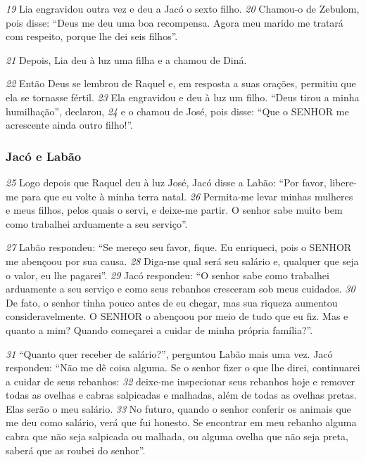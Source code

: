 \bigskip   
\textit{\tiny 19}
Lia
engravidou outra vez e deu a Jacó o sexto filho. 
\textit{\tiny 20}
Chamou-o de Zebulom,
pois
disse: “Deus me deu uma boa recompensa. Agora meu marido me tratará com
respeito, porque lhe dei seis filhos”. 

\bigskip   
\textit{\tiny 21}
Depois, Lia deu à luz uma filha e a chamou
de Diná.

\bigskip   
\textit{\tiny 22}
Então Deus se lembrou de Raquel e, em resposta a suas orações, permitiu que
ela se tornasse fértil. 
\textit{\tiny 23}
Ela engravidou e deu à luz um filho. “Deus tirou a minha
humilhação”, declarou, 
\textit{\tiny 24}
e o chamou de José,
pois disse: “Que o SENHOR me
acrescente ainda outro filho!”.

\bigskip   
\subsubsection*{Jacó e Labão}
\textit{\tiny 25}
Logo depois que Raquel deu à luz José, Jacó disse a Labão: “Por favor, libere-me
para que eu volte à minha terra natal. 
\textit{\tiny 26}
Permita-me levar minhas mulheres e
meus filhos, pelos quais o servi, e deixe-me partir. O senhor sabe muito bem
como trabalhei arduamente a seu serviço”.

\bigskip   
\textit{\tiny 27}
Labão respondeu: “Se mereço seu favor, fique. Eu enriqueci, pois
o SENHOR
me abençoou por sua causa. 
\textit{\tiny 28}
Diga-me qual será seu salário e, qualquer que seja o
valor, eu lhe pagarei”.
\textit{\tiny 29}
Jacó respondeu: “O senhor sabe como trabalhei arduamente a seu serviço e
como seus rebanhos cresceram sob meus cuidados. 
\textit{\tiny 30}
De fato, o senhor tinha
pouco antes de eu chegar, mas sua riqueza aumentou consideravelmente. O
SENHOR o abençoou por meio de tudo que eu fiz. Mas e quanto a mim? Quando
começarei a cuidar de minha própria família?”.

\bigskip   
\textit{\tiny 31}
“Quanto quer receber de salário?”, perguntou Labão mais uma vez.
   Jacó respondeu: “Não me dê coisa alguma. Se o senhor fizer o que lhe direi,
continuarei a cuidar de seus rebanhos: 
\textit{\tiny 32}
deixe-me inspecionar seus rebanhos
hoje e remover todas as ovelhas e cabras salpicadas e malhadas, além de todas as
ovelhas pretas. Elas serão o meu salário. 
\textit{\tiny 33}
No futuro, quando o senhor conferir os
animais que me deu como salário, verá que fui honesto. Se encontrar em meu
rebanho alguma cabra que não seja salpicada ou malhada, ou alguma ovelha que
não seja preta, saberá que as roubei do senhor”.

